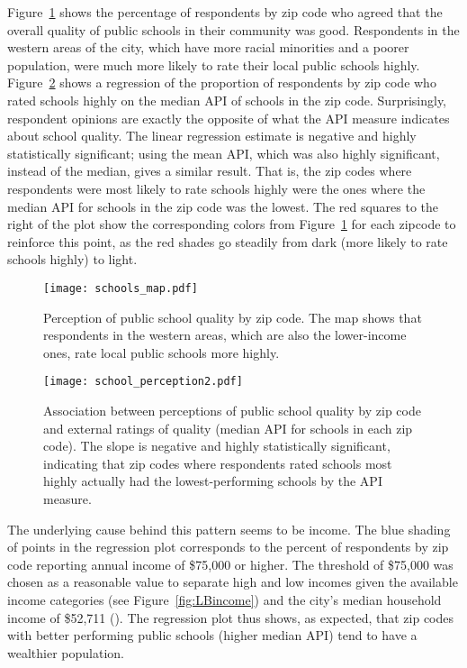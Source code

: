 Figure~\ref{fig:schoolmap} shows the percentage of respondents by zip code who agreed that the overall quality of public schools in their community was good.  Respondents in the western areas of the city, which have more racial minorities and a poorer population, were much more likely to rate their local public schools highly.  Figure~\ref{fig:schoolreg} shows a regression of the proportion of respondents by zip code who rated schools highly on the median API of schools in the zip code.  Surprisingly, respondent opinions are exactly the opposite of what the API measure indicates about school quality.  The linear regression estimate is negative and highly statistically significant; using the mean API, which was also highly significant, instead of the median, gives a similar result.  That is, the zip codes where respondents were most likely to rate schools highly were the ones where the median API for schools in the zip code was the lowest.  The red squares to the right of the plot show the corresponding colors from Figure~\ref{fig:schoolmap} for each zipcode to reinforce this point, as the red shades go steadily from dark (more likely to rate schools highly) to light.\\
\begin{figure}
\centering
\texttt{[image: schools\_map.pdf]}
\caption{Perception of public school quality by zip code.  The map shows that respondents in the western areas, which are also the lower-income ones, rate local public schools more highly.}
\label{fig:schoolmap}
\end{figure}
\begin{figure}
\centering
\texttt{[image: school\_perception2.pdf]} 
\caption{Association between perceptions of public school quality by zip code and external ratings of quality (median API for schools in each zip code).  The slope is negative and highly statistically significant, indicating that zip codes where respondents rated schools most highly actually had the lowest-performing schools by the API measure. }
\label{fig:schoolreg}    
\end{figure}
\indent
The underlying cause behind this pattern seems to be income.  The blue shading of points in the regression plot corresponds to the percent of respondents by zip code reporting annual income of \$75,000 or higher.  The threshold of \$75,000 was chosen as a reasonable value to separate high and low incomes given the available income categories (see Figure~\ref{fig:LBincome}) and the city's median household income of \$52,711 (\citealt{CenFacts}). The regression plot thus shows, as expected, that zip codes with better performing public schools (higher median API) tend to have a wealthier population.\\
